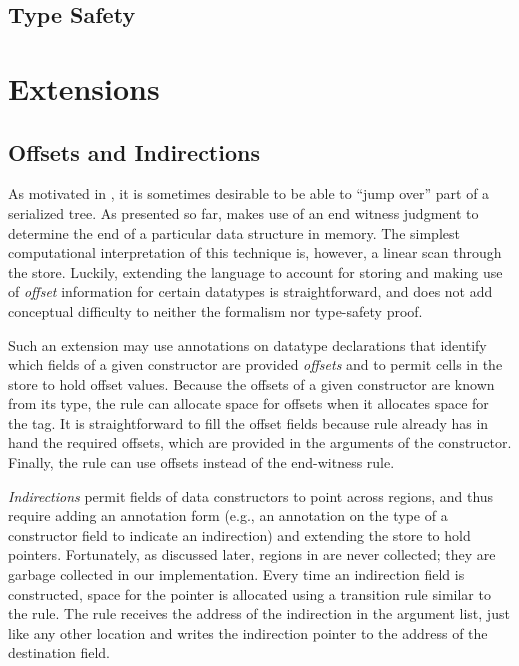 \subsection{Type Safety}
\label{subsec:typesafety}



\section{Extensions}\label{sec:extensions}


\subsection{Offsets and Indirections}\label{subsec:indirections}

As motivated in , it is sometimes desirable to be
able to ``jump over'' part of a serialized tree.
%
As presented so far, \ourcalc{} makes use of an end witness judgment
to determine the end of a particular data structure in memory.
%
The simplest computational interpretation of this technique is,
however, a linear scan through the store.
%
Luckily, extending the language to account for storing and making use
of \emph{offset} information for certain datatypes is
straightforward, and does not add conceptual difficulty to
neither the formalism nor type-safety proof.

Such an extension may use annotations on datatype declarations
that identify which fields of a given constructor are provided \emph{offsets}
and to permit cells in the store to hold offset values.
%
Because the offsets of a given constructor are known from its type,
the \textsc{\dletloctag{}} rule can allocate space for offsets when it
allocates space for the tag.
%
It is straightforward to fill the offset fields because \textsc{\ddatacon{}}
rule already has in hand the required offsets, which are provided in
the arguments of the constructor.
%
Finally, the \textsc{\dcase{}} rule can use offsets instead of
the end-witness rule.

\emph{Indirections} permit fields of data constructors to point across
regions, and thus require adding an annotation form (e.g., an
annotation on the type of a constructor field to indicate an
indirection) and extending the store to hold pointers.
%
Fortunately, as discussed later, regions in \ourcalc{} are never
collected; they are garbage collected in our implementation.
%
Every time an indirection field is constructed, space for the pointer
is allocated using a transition rule similar to the \textsc{\dletloctag{}}
rule.
%
The \textsc{\ddatacon{}} rule receives the address of the indirection in the
argument list, just like any other location and writes the indirection
pointer to the address of the destination field.
%

